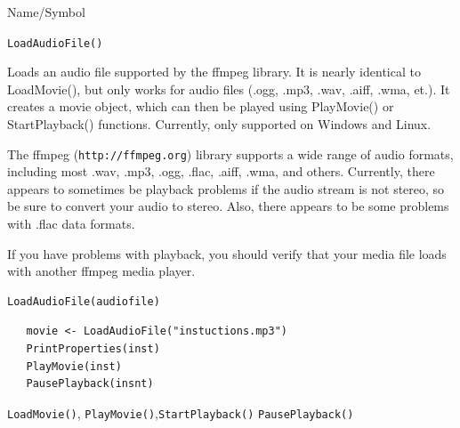 \begin{desc}{Name/Symbol}
\item[Name/Symbol]	\verb+LoadAudioFile()+
 
\item[Description] Loads an audio file supported by  the ffmpeg library.  It is nearly identical to
LoadMovie(), but only works for audio files (.ogg, .mp3, .wav, .aiff, .wma, et.).  It creates a movie
object, which can then be played using PlayMovie() or StartPlayback() functions.  Currently,
only supported on Windows and Linux.

The ffmpeg (\verb+http://ffmpeg.org+) library supports a wide range of audio formats,
including most .wav, .mp3, .ogg, .flac, .aiff, .wma, and others.   Currently, there appears to sometimes
be playback problems if the audio stream is not stereo, so be sure to convert your audio to stereo.
Also, there appears to be some problems with .flac data formats.

If you have problems with playback, 
you should verify that your media file loads with another ffmpeg media player.

\item[Usage]		
\begin{verbatim}
LoadAudioFile(audiofile)
\end{verbatim}

\item[Example]	
\begin{verbatim}
   movie <- LoadAudioFile("instuctions.mp3")
   PrintProperties(inst)
   PlayMovie(inst)
   PausePlayback(insnt)
\end{verbatim}

\item[See Also]  \verb+LoadMovie()+, \verb+PlayMovie()+,\verb+StartPlayback()+ \verb+PausePlayback()+
\end{desc}


